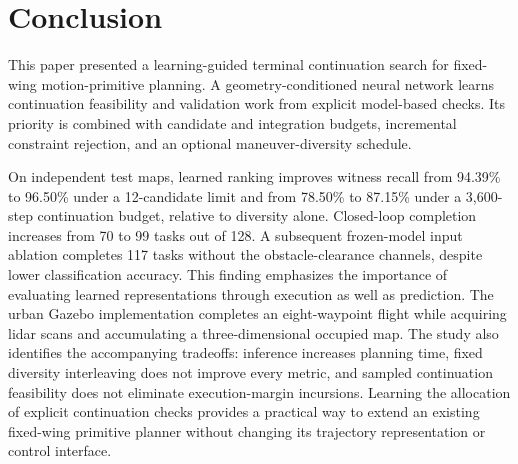 \section{Conclusion}
This paper presented a learning-guided terminal continuation search for fixed-wing motion-primitive planning. A geometry-conditioned neural network learns continuation feasibility and validation work from explicit model-based checks. Its priority is combined with candidate and integration budgets, incremental constraint rejection, and an optional maneuver-diversity schedule.

On independent test maps, learned ranking improves witness recall from 94.39\% to 96.50\% under a 12-candidate limit and from 78.50\% to 87.15\% under a 3,600-step continuation budget, relative to diversity alone. Closed-loop completion increases from 70 to 99 tasks out of 128. A subsequent frozen-model input ablation completes 117 tasks without the obstacle-clearance channels, despite lower classification accuracy. This finding emphasizes the importance of evaluating learned representations through execution as well as prediction. The urban Gazebo implementation completes an eight-waypoint flight while acquiring lidar scans and accumulating a three-dimensional occupied map. The study also identifies the accompanying tradeoffs: inference increases planning time, fixed diversity interleaving does not improve every metric, and sampled continuation feasibility does not eliminate execution-margin incursions. Learning the allocation of explicit continuation checks provides a practical way to extend an existing fixed-wing primitive planner without changing its trajectory representation or control interface.
